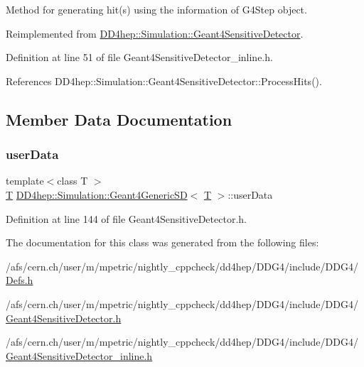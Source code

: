 Method for generating hit(s) using the information of G4\+Step object. 



Reimplemented from \hyperlink{class_d_d4hep_1_1_simulation_1_1_geant4_sensitive_detector_ac889694c4406ea089f3172b73da49134}{D\+D4hep\+::\+Simulation\+::\+Geant4\+Sensitive\+Detector}.



Definition at line 51 of file Geant4\+Sensitive\+Detector\+\_\+inline.\+h.



References D\+D4hep\+::\+Simulation\+::\+Geant4\+Sensitive\+Detector\+::\+Process\+Hits().



\subsection{Member Data Documentation}
\hypertarget{class_d_d4hep_1_1_simulation_1_1_geant4_generic_s_d_a95379cb6ef1953981bd7f12039299e47}{}\label{class_d_d4hep_1_1_simulation_1_1_geant4_generic_s_d_a95379cb6ef1953981bd7f12039299e47} 
\subsubsection{\texorpdfstring{user\+Data}{userData}}
{\footnotesize\ttfamily template$<$class T $>$ \\
\hyperlink{class_t}{T} \hyperlink{class_d_d4hep_1_1_simulation_1_1_geant4_generic_s_d}{D\+D4hep\+::\+Simulation\+::\+Geant4\+Generic\+SD}$<$ \hyperlink{class_t}{T} $>$\+::user\+Data\hspace{0.3cm}{\ttfamily [private]}}



Definition at line 144 of file Geant4\+Sensitive\+Detector.\+h.



The documentation for this class was generated from the following files\+:\begin{DoxyCompactItemize}
\item 
/afs/cern.\+ch/user/m/mpetric/nightly\+\_\+cppcheck/dd4hep/\+D\+D\+G4/include/\+D\+D\+G4/\hyperlink{_defs_8h}{Defs.\+h}\item 
/afs/cern.\+ch/user/m/mpetric/nightly\+\_\+cppcheck/dd4hep/\+D\+D\+G4/include/\+D\+D\+G4/\hyperlink{_geant4_sensitive_detector_8h}{Geant4\+Sensitive\+Detector.\+h}\item 
/afs/cern.\+ch/user/m/mpetric/nightly\+\_\+cppcheck/dd4hep/\+D\+D\+G4/include/\+D\+D\+G4/\hyperlink{_geant4_sensitive_detector__inline_8h}{Geant4\+Sensitive\+Detector\+\_\+inline.\+h}\end{DoxyCompactItemize}
